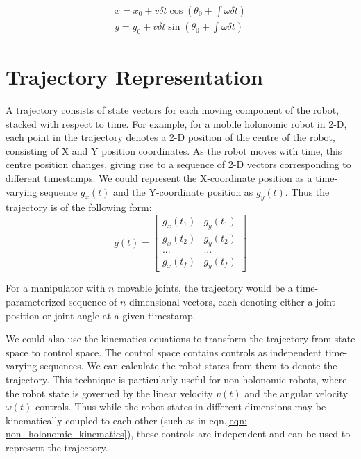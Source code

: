 \begin{subequations}
\begin{align}
x = x_0 + v\delta t\cos{(\theta_0+\int\omega\delta t)}\\
y = y_0 + v\delta t\sin{(\theta_0+\int\omega\delta t)}
\end{align}
\end{subequations} 

\section{Trajectory Representation}\label{sec:trajectory_rep}

A trajectory consists of state vectors for each moving component of the robot, stacked with respect to time. For example, for a mobile holonomic robot in 2-D, each point in the trajectory denotes a 2-D position of the centre of the robot, consisting of X and Y position coordinates. As the robot moves with time, this centre position changes, giving rise to a sequence of 2-D vectors corresponding to different timestamps. We could represent the X-coordinate position as a time-varying sequence $g_x(t)$ and the Y-coordinate position as $g_y(t)$. Thus the trajectory is of the following form: 
\begin{equation}
    g(t) = \begin{bmatrix}
    g_x(t_1) & g_y(t_1)\\
    g_x(t_2) & g_y(t_2)\\
    ... & ... \\
    g_x(t_f) & g_y(t_f)
    \end{bmatrix}
\end{equation}

For a manipulator with $n$ movable joints, the trajectory would be a time-parameterized sequence of $n$-dimensional vectors, each denoting either a joint position or joint angle at a given timestamp. 

We could also use the kinematics equations to transform the trajectory from state space to control space. The control space contains controls as independent time-varying sequences. We can calculate the robot states from them to denote the trajectory. This technique is particularly useful for non-holonomic robots, where the robot state is governed by the linear velocity $v(t)$ and the angular velocity $\omega(t)$ controls. Thus while the robot states in different dimensions may be kinematically coupled to each other (such as in eqn.\ref{eqn: non_holonomic_kinematics}), these controls are independent and can be used to represent the trajectory. 

